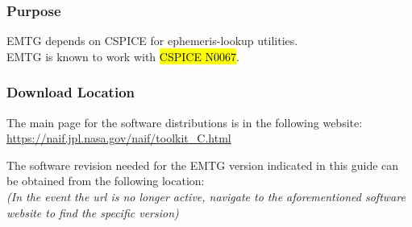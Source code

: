 
\subsubsection{Purpose}
\noindent \ac{EMTG} depends on CSPICE for ephemeris-lookup utilities. \\ \ac{EMTG} is known to work with \hl{CSPICE N0067}. 

\subsubsection{Download Location}
\noindent The main page for the software distributions is in the following website: \\
\url{https://naif.jpl.nasa.gov/naif/toolkit_C.html} 


\noindent The software revision needed for the EMTG version indicated in this guide can be obtained from the following location: \\
\emph{(In the event the url is no longer active, navigate to the aforementioned software website to find the specific version)} \\


